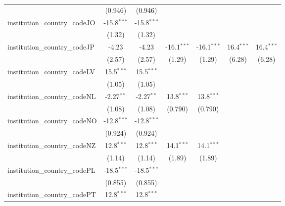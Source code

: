 \begin{tabular}{lcccccc}
                                         & (0.946)       & (0.946)       &               &               &               &   \\   
   institution\_country\_codeJO          & -15.8$^{***}$ & -15.8$^{***}$ &               &               &               &   \\   
                                         & (1.32)        & (1.32)        &               &               &               &   \\   
   institution\_country\_codeJP          & -4.23         & -4.23         & -16.1$^{***}$ & -16.1$^{***}$ & 16.4$^{***}$  & 16.4$^{***}$\\   
                                         & (2.57)        & (2.57)        & (1.29)        & (1.29)        & (6.28)        & (6.28)\\   
   institution\_country\_codeLV          & 15.5$^{***}$  & 15.5$^{***}$  &               &               &               &   \\   
                                         & (1.05)        & (1.05)        &               &               &               &   \\   
   institution\_country\_codeNL          & -2.27$^{**}$  & -2.27$^{**}$  & 13.8$^{***}$  & 13.8$^{***}$  &               &   \\   
                                         & (1.08)        & (1.08)        & (0.790)       & (0.790)       &               &   \\   
   institution\_country\_codeNO          & -12.8$^{***}$ & -12.8$^{***}$ &               &               &               &   \\   
                                         & (0.924)       & (0.924)       &               &               &               &   \\   
   institution\_country\_codeNZ          & 12.8$^{***}$  & 12.8$^{***}$  & 14.1$^{***}$  & 14.1$^{***}$  &               &   \\   
                                         & (1.14)        & (1.14)        & (1.89)        & (1.89)        &               &   \\   
   institution\_country\_codePL          & -18.5$^{***}$ & -18.5$^{***}$ &               &               &               &   \\   
                                         & (0.855)       & (0.855)       &               &               &               &   \\   
   institution\_country\_codePT          & 12.8$^{***}$  & 12.8$^{***}$  &               &               &               &   \\   

\end{tabular}
